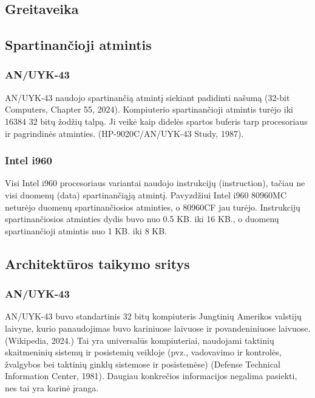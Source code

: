 \documentclass{article}
\begin{document}
\subsection{Greitaveika}
\subsection{Spartinančioji atmintis}
\subsubsection{AN/UYK-43}
AN/UYK-43 naudojo spartinančią atmintį siekiant padidinti našumą (32-bit Computers, Chapter 55, 2024). Kompiuterio spartinančioji atmintis turėjo iki 16384 32 bitų žodžių talpą. Ji veikė kaip didelės spartos buferis tarp procesoriaus ir pagrindinės atminties. (HP-9020C/AN/UYK-43 Study, 1987).
\subsubsection{Intel i960}
Visi Intel i960 procesoriaus variantai naudojo instrukcijų (instruction), tačiau ne visi duomenų (data) spartinančiąją atmintį. Pavyzdžiui Intel i960 80960MC neturėjo duomenų spartinančiosios atminties, o 80960CF jau turėjo. Instrukcijų spartinančiosios atminties dydis buvo nuo 0.5 KB. iki 16 KB., o duomenų spartinančioji atmintis nuo 1 KB. iki 8 KB.
\subsection{Architektūros taikymo sritys}
\subsubsection{AN/UYK-43}
AN/UYK-43 buvo standartinis 32 bitų kompiuteris Jungtinių Amerikos valstijų laivyne, kurio panaudojimas buvo kariniuose laivuose ir povandeniniuose laivuose. (Wikipedia, 2024.) Tai yra universalūs kompiuteriai, naudojami taktinių skaitmeninių sistemų ir posistemių veikloje (pvz., vadovavimo ir kontrolės, žvalgybos bei taktinių ginklų sistemose ir posistemėse) (Defense Technical Information Center, 1981). Daugiau konkrečios informacijos negalima pasiekti, nes tai yra karinė įranga.
\end{document}
